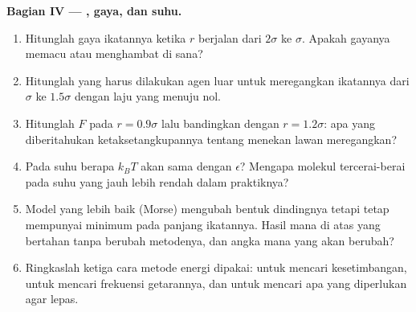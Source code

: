 \begin{problem}
\medskip
\noindent\textbf{Bagian IV --- , gaya, dan suhu.}
\begin{enumerate}[resume]
  \item Hitunglah  gaya ikatannya ketika $r$ berjalan dari
        $2\sigma$ ke $\sigma$. Apakah gayanya memacu atau menghambat di sana?
  \item Hitunglah  yang harus dilakukan agen luar untuk meregangkan
        ikatannya dari $\sigma$ ke $1.5\sigma$ dengan laju yang menuju nol.
  \item Hitunglah $F$ pada $r = 0.9\sigma$ lalu bandingkan dengan
        $r = 1.2\sigma$: apa yang diberitahukan ketaksetangkupannya
        tentang menekan lawan meregangkan?
  \item Pada suhu berapa $k_BT$ akan sama dengan $\epsilon$? Mengapa
        molekul tercerai-berai pada suhu yang jauh lebih rendah dalam
        praktiknya?
  \item Model yang lebih baik (Morse) mengubah bentuk dindingnya tetapi
        tetap mempunyai minimum pada panjang ikatannya. Hasil mana di
        atas yang bertahan tanpa berubah metodenya, dan angka mana yang
        akan berubah?
  \item Ringkaslah ketiga cara metode energi dipakai: untuk mencari
        kesetimbangan, untuk mencari frekuensi getarannya, dan untuk
        mencari apa yang diperlukan agar lepas.
\end{enumerate}
\end{problem}

